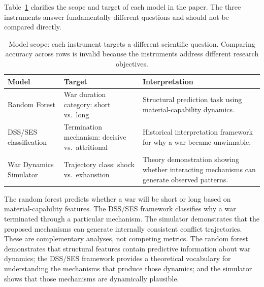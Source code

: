Table~\ref{tab:model_scope} clarifies the scope and target of each model in the paper. The three instruments answer fundamentally different questions and should not be compared directly.

\begin{table}[ht]
\centering
\caption{Model scope: each instrument targets a different scientific question. Comparing accuracy across rows is invalid because the instruments address different research objectives.}
\label{tab:model_scope}
\begin{tabularx}{\textwidth}{@{}>{\RaggedRight\arraybackslash}p{} >{\RaggedRight\arraybackslash}p{} >{\RaggedRight\arraybackslash}X@{}}
\toprule
\textbf{Model} & \textbf{Target} & \textbf{Interpretation} \\
\midrule
Random Forest & War duration category: short vs.\ long & Structural prediction task using material-capability dynamics. \\
DSS/SES classification & Termination mechanism: decisive vs.\ attritional & Historical interpretation framework for why a war became unwinnable. \\
War Dynamics Simulator & Trajectory class: shock vs.\ exhaustion & Theory demonstration showing whether interacting mechanisms can generate observed patterns. \\
\bottomrule
\end{tabularx}
\end{table}

The random forest predicts whether a war will be short or long based on material-capability features. The DSS/SES framework classifies why a war terminated through a particular mechanism. The simulator demonstrates that the proposed mechanisms can generate internally consistent conflict trajectories. These are complementary analyses, not competing metrics. The random forest demonstrates that structural features contain predictive information about war dynamics; the DSS/SES framework provides a theoretical vocabulary for understanding the mechanisms that produce those dynamics; and the simulator shows that those mechanisms are dynamically plausible.
